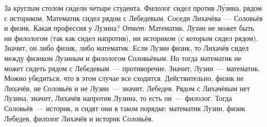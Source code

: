 \problem
За круглым столом сидели четыре студента.
Филолог сидел против Л\'{у}зина, рядом с историком.
Математик сидел рядом с Лебедевым.
Соседи Лихачёва~--- Соловьёв и физик.
Какая профессия у Лузина?
\solution
\emph{Ответ:} Математик.
Лузин не может быть ни филологом (так как сидел напротив), ни историком
(с которым сидел рядом).
Значит, он либо физик, либо математик.
Если Лузин физик, то Лихачёв сидел между физиком Лузиным и филологом
Соловьёвым.
Но тогда математик не может сидеть рядом с Лебедевым~--- противоречие.
Значит, Лузин~--- математик.
Можно убедиться, что в этом случае все сходится.
Действительно, физик не Лихачёв, не Соловьёв и не Лузин~--- значит, Лебедев.
Рядом с Лихачёвым нет Лузина, значит, Лихачёв напротив Лузина, то есть он~---
филолог.
Тогда Соловьёв~--- историк, и сидят они в таком порядке:
математик Лузин, физик Лебедев, филолог Лихачёв и историк Соловьёв.
\endproblem
